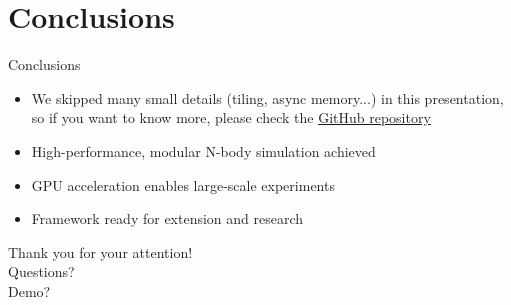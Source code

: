 \documentclass{beamer}
\begin{document}
\section{Conclusions}
\begin{frame}{Conclusions}
    \begin{itemize}
        \item We skipped many small details (tiling, async memory...) in this presentation, so if you want to know more, please check the \href{https://github.com/tusca99/N-body-simulation.git}{GitHub repository}
        \item High-performance, modular N-body simulation achieved
        \item GPU acceleration enables large-scale experiments
        \item Framework ready for extension and research
    \end{itemize}
\end{frame}

\begin{emptyframe}
    \centering
    Thank you for your attention! \\
    Questions? \\
    Demo?
\end{emptyframe}
\end{document}
